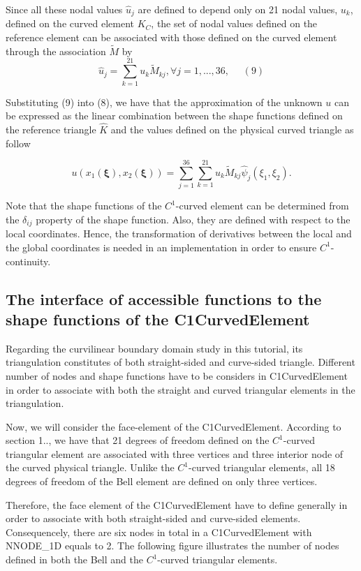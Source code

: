 Since all these nodal values $ \hat{u}_{j} $ are defined to depend only on 21 nodal values, $ u_{k} $, defined on the curved element $ K_{C} $, the set of nodal values defined on the reference element can be associated with those defined on the curved element through the association $ \tilde{M} $ by \[ \hat{u}_{j} = \sum_{k=1}^{21}{u_{k}\tilde{M}_{kj}}, \forall j=1,...,36, \ \ \ \ \ \ (9) \]

Substituting (9) into (8), we have that the approximation of the unknown $ u$ can be expressed as the linear combination between the shape functions defined on the reference triangle $ \hat{K} $ and the values defined on the physical curved triangle as follow

\[ u(x_1(\mathbf{\xi}),x_2(\mathbf{\xi})) = \sum_{j=1}^{36}{\sum_{k=1}^{21}{u_{k}\tilde{M}_{kj}}\hat{\psi}_{j}}(\xi_{1},\xi_{2}). \]

Note that the shape functions of the $ C^1 $-\/curved element can be determined from the $ \delta_{ij} $ property of the shape function. Also, they are defined with respect to the local coordinates. Hence, the transformation of derivatives between the local and the global coordinates is needed in an implementation in order to ensure $ C^1 $-\/continuity.



\hypertarget{index_interface}{}\subsection{The interface of accessible functions to the shape functions of the C1\+Curved\+Element}\label{index_interface}
Regarding the curvilinear boundary domain study in this tutorial, its triangulation constitutes of both straight-\/sided and curve-\/sided triangle. Different number of nodes and shape functions have to be considers in {\ttfamily C1\+Curved\+Element} in order to associate with both the straight and curved triangular elements in the triangulation.

Now, we will consider the face-\/element of the {\ttfamily C1\+Curved\+Element}. According to section 1.., we have that 21 degrees of freedom defined on the $ C^1 $-\/curved triangular element are associated with three vertices and three interior node of the curved physical triangle. Unlike the $ C^1 $-\/curved triangular elements, all 18 degrees of freedom of the Bell element are defined on only three vertices.

Therefore, the face element of the {\ttfamily C1\+Curved\+Element} have to define generally in order to associate with both straight-\/sided and curve-\/sided elements. Consequencely, there are six nodes in total in a {\ttfamily C1\+Curved\+Element} with {\ttfamily N\+N\+O\+D\+E\+\_\+1D} equals to 2. The following figure illustrates the number of nodes defined in both the Bell and the $ C^1 $-\/curved triangular elements.

